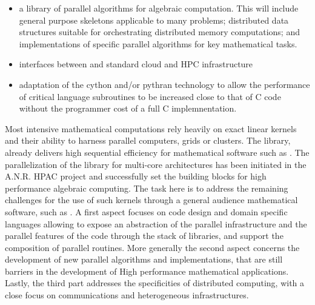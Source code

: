 \begin{workpackage}
\begin{tasklist}
\begin{task}[title=GAP,id=hpc-gap]
\begin{itemize}
\item a library of parallel algorithms for algebraic computation. This
  will include general purpose skeletons applicable to many problems;
  distributed data structures suitable for orchestrating distributed
  memory computations; and implementations of specific parallel algorithms for key
  mathematical tasks.  
\item interfaces between \GAP and standard cloud and HPC
  infrastructure 
\item adaptation of the cython and/or pythran technology to allow the
  performance of critical \GAP language subroutines to be increased
  close to that of C code without the programmer cost of a full C implemnentation.
\end{itemize}
\end{task}

\begin{task}[title=Linbox,id=hpc-linbox]
Most intensive mathematical computations rely heavily on exact linear kernels
and their ability to harness parallel computers, grids or clusters. The \Linbox
library, already delivers high sequential efficiency for mathematical software
such as \Sage. The parallelization of the library for multi-core architectures
has been initiated in the A.N.R. HPAC project and successfully set the building
blocks for high performance algebraic computing. 
The task here is to  address the remaining challenges for the use of such
kernels through a general audience mathematical software, such as \Sage.
A first aspect focuses on code design and domain specific languages allowing to
expose an abstraction of the parallel infrastructure and the parallel features
of the code through the stack of libraries, and support the
composition of parallel routines.  More generally the second aspect concerns the
development of new parallel algorithms and implementations, that are still
barriers in the development of High performance mathematical
applications. Lastly, the third part addresses the specificities of  distributed
computing, with a close focus on communications and heterogeneous infrastructures.


\end{task}
\end{tasklist}
\end{workpackage}

